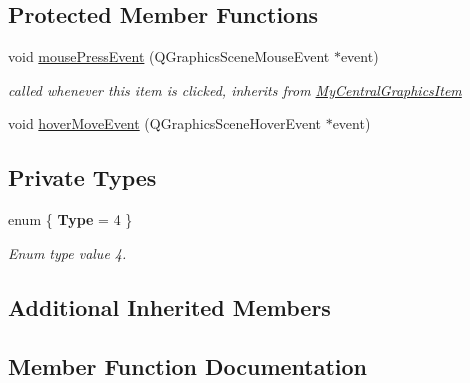 \subsection*{Protected Member Functions}
\begin{DoxyCompactItemize}
\item 
void \hyperlink{class_my_central_ellipse_item_ab1b7f9aec994268061b5a38d2cd5744d}{mouse\+Press\+Event} (Q\+Graphics\+Scene\+Mouse\+Event $\ast$event)
\begin{DoxyCompactList}\small\item\em called whenever this item is clicked, inherits from \hyperlink{class_my_central_graphics_item}{My\+Central\+Graphics\+Item} \end{DoxyCompactList}\item 
void \hyperlink{class_my_central_ellipse_item_a0d465a1d4c907bda9d57b3a3207097a9}{hover\+Move\+Event} (Q\+Graphics\+Scene\+Hover\+Event $\ast$event)
\end{DoxyCompactItemize}
\subsection*{Private Types}
\begin{DoxyCompactItemize}
\item 
\hypertarget{class_my_central_ellipse_item_a275b0e7f1c7dd42d1601f29dcaf17ae5}{}enum \{ {\bfseries Type} = 4
 \}\label{class_my_central_ellipse_item_a275b0e7f1c7dd42d1601f29dcaf17ae5}

\begin{DoxyCompactList}\small\item\em Enum type value 4. \end{DoxyCompactList}\end{DoxyCompactItemize}
\subsection*{Additional Inherited Members}


\subsection{Member Function Documentation}
\hypertarget{class_my_central_ellipse_item_a0d465a1d4c907bda9d57b3a3207097a9}{}
